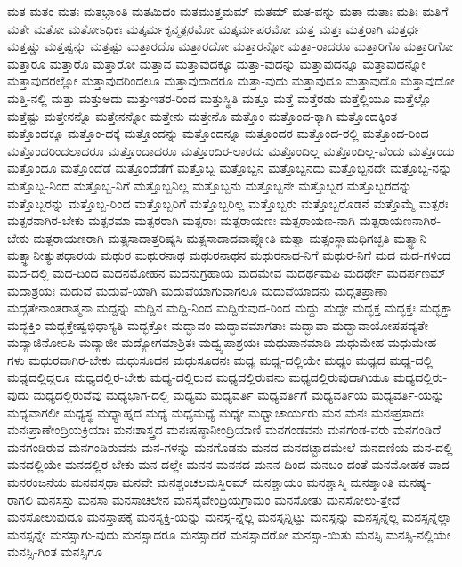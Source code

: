 {ಮತ
ಮತಂ
ಮತಃ
ಮತಭ್ರಾಂತಿ
ಮತಮಿದಂ
ಮತಮುತ್ತಮಮ್
ಮತಮ್
ಮತ-ವನ್ನು
ಮತಾ
ಮತಾಃ
ಮತಿಃ
ಮತಿಗೆ
ಮತೇ
ಮತೋ
ಮತೋಽಧಿಕಃ
ಮತ್ಕರ್ಮಕೃನ್ಮತ್ಪರಮೋ
ಮತ್ಕರ್ಮಪರಮೋ
ಮತ್ತ
ಮತ್ತಃ
ಮತ್ತರಾಗಿ
ಮತ್ತರ್ಧ
ಮತ್ತಷ್ಚು
ಮತ್ತಷ್ಟನ್ನು
ಮತ್ತಷ್ಟು
ಮತ್ತಾರದೊ
ಮತ್ತಾರದೋ
ಮತ್ತಾರನ್ನೋ
ಮತ್ತಾ-ರಾದರೂ
ಮತ್ತಾರಿಗೊ
ಮತ್ತಾರಿಗೋ
ಮತ್ತಾರೂ
ಮತ್ತಾರೊ
ಮತ್ತಾರೋ
ಮತ್ತಾವ
ಮತ್ತಾವುದಕ್ಕೂ
ಮತ್ತಾ-ವುದನ್ನು
ಮತ್ತಾವುದನ್ನೂ
ಮತ್ತಾವುದನ್ನೋ
ಮತ್ತಾವುದರಲ್ಲೋ
ಮತ್ತಾವುದರಿಂದಲೂ
ಮತ್ತಾವುದಾದರೂ
ಮತ್ತಾ-ವುದು
ಮತ್ತಾವುದೂ
ಮತ್ತಾವುದೊ
ಮತ್ತಾವುದೋ
ಮತ್ತಿ-ನಲ್ಲಿ
ಮತ್ತು
ಮತ್ತುಅದು
ಮತ್ತುಇತರ-ರಿಂದ
ಮತ್ತುಸ್ಥಿತಿ
ಮತ್ತೂ
ಮತ್ತೆ
ಮತ್ತೆರಡು
ಮತ್ತೆಲ್ಲಿಯೂ
ಮತ್ತೆಲ್ಲೊ
ಮತ್ತೆಷ್ಟು
ಮತ್ತೇನನ್ನೊ
ಮತ್ತೇನನ್ನೋ
ಮತ್ತೇನು
ಮತ್ತೇನೊ
ಮತ್ತೊಂ
ಮತ್ತೊಂದ-ಕ್ಕಾಗಿ
ಮತ್ತೊಂದಕ್ಕಿಂತ
ಮತ್ತೊಂದಕ್ಕೂ
ಮತ್ತೊಂ-ದಕ್ಕೆ
ಮತ್ತೊಂದನ್ನು
ಮತ್ತೊಂದನ್ನೂ
ಮತ್ತೊಂದರ
ಮತ್ತೊಂದ-ರಲ್ಲಿ
ಮತ್ತೊಂದ-ರಿಂದ
ಮತ್ತೊಂದರಿಂದಲಾದರೂ
ಮತ್ತೊಂದಾದರೂ
ಮತ್ತೊಂದಿರ-ಲಾರದು
ಮತ್ತೊಂದಿಲ್ಲ
ಮತ್ತೊಂದಿಲ್ಲ-ವೆಂದು
ಮತ್ತೊಂದು
ಮತ್ತೊಂದೂ
ಮತ್ತೊಂದೆಡೆ
ಮತ್ತೊಂದೆಡೆಗೆ
ಮತ್ತೊಬ್ಬ
ಮತ್ತೊಬ್ಬನ
ಮತ್ತೊಬ್ಬನದು
ಮತ್ತೊಬ್ಬನದೇ
ಮತ್ತೊಬ್ಬ-ನನ್ನು
ಮತ್ತೊಬ್ಬ-ನಿಂದ
ಮತ್ತೊಬ್ಬ-ನಿಗೆ
ಮತ್ತೊಬ್ಬನಿಲ್ಲ
ಮತ್ತೊಬ್ಬನು
ಮತ್ತೊಬ್ಬನೇ
ಮತ್ತೊಬ್ಬರ
ಮತ್ತೊಬ್ಬರದನ್ನು
ಮತ್ತೊಬ್ಬರನ್ನು
ಮತ್ತೊಬ್ಬ-ರಿಂದ
ಮತ್ತೊಬ್ಬರಿಗೆ
ಮತ್ತೊಬ್ಬರಿಲ್ಲ
ಮತ್ತೊಬ್ಬರು
ಮತ್ತೊಬ್ಬರೊಡನೆ
ಮತ್ತೊಮ್ಮೆ
ಮತ್ಪರಃ
ಮತ್ಪರನಾಗಿರ-ಬೇಕು
ಮತ್ಪರಮಾ
ಮತ್ಪರರಾಗಿ
ಮತ್ಪರಾಃ
ಮತ್ಪರಾಯಣಃ
ಮತ್ಪರಾಯಣ-ನಾಗಿ
ಮತ್ಪರಾಯಣನಾಗಿರ-ಬೇಕು
ಮತ್ಪರಾಯಣರಾಗಿ
ಮತ್ಪ್ರಸಾದಾತ್ತರಿಷ್ಯಸಿ
ಮತ್ಪ್ರಸಾದಾದವಾಪ್ನೋತಿ
ಮತ್ವಾ
ಮತ್ಸಂಸ್ಥಾಮಧಿಗಚ್ಛತಿ
ಮತ್ಸ್ಥಾನಿ
ಮತ್ಸ್ಥಾನೀತ್ಯುಪಧಾರಯ
ಮಥುರ
ಮಥುರನಾಥ
ಮಥುರನಾಥನ
ಮಥುರನಾಥ-ನಿಗೆ
ಮಥುರ-ನಿಗೆ
ಮದ
ಮದ-ಗಳಿಂದ
ಮದ-ದಲ್ಲಿ
ಮದ-ದಿಂದ
ಮದನಮೋಹನ
ಮದನುಗ್ರಹಾಯ
ಮದಮೇವ
ಮದರ್ಥಮಪಿ
ಮದರ್ಥೇ
ಮದರ್ಪಣಮ್
ಮದಾಶ್ರಯಃ
ಮದುವೆ
ಮದುವೆ-ಯಾಗಿ
ಮದುವೆಯಾಗುವಾಗಲೂ
ಮದುವೆಯಾದನು
ಮದ್ಗತಪ್ರಾಣಾ
ಮದ್ಗತೇನಾಂತರಾತ್ಮನಾ
ಮದ್ದನ್ನು
ಮದ್ದಿನ
ಮದ್ದಿ-ನಿಂದ
ಮದ್ದಿರುವುದ-ರಿಂದ
ಮದ್ದು
ಮದ್ದೇ
ಮದ್ಭಕ್ತ
ಮದ್ಭಕ್ತಃ
ಮದ್ಭಕ್ತಾ
ಮದ್ಭಕ್ತಿಂ
ಮದ್ಭಕ್ತೇಷ್ವಭಿಧಾಸ್ಯತಿ
ಮದ್ಭಕ್ತೋ
ಮದ್ಭಾವಂ
ಮದ್ಭಾವಮಾಗತಾಃ
ಮದ್ಭಾವಾ
ಮದ್ಭಾವಾಯೋಪಪದ್ಯತೇ
ಮದ್ಯಾಜಿನೋಽಪಿ
ಮದ್ಯಾಜೀ
ಮದ್ಯೋಗಮಾಶ್ರಿತಃ
ಮದ್ವ್ಯಪಾಶ್ರಯಃ
ಮಧುಪಾನಮಾಡಿ
ಮಧುಮೇಹ
ಮಧುಮೇಹ-ಗಳು
ಮಧುರವಾಗಿರ-ಬೇಕು
ಮಧುಸೂದನ
ಮಧುಸೂದನಃ
ಮಧ್ಯ
ಮಧ್ಯ-ದಲ್ಲಿಯೇ
ಮಧ್ಯಂ
ಮಧ್ಯದ
ಮಧ್ಯ-ದಲ್ಲಿ
ಮಧ್ಯದಲ್ಲಿದ್ದರೂ
ಮಧ್ಯದಲ್ಲಿರ-ಬೇಕು
ಮಧ್ಯ-ದಲ್ಲಿರುವ
ಮಧ್ಯದಲ್ಲಿರುವನು
ಮಧ್ಯದಲ್ಲಿರುವುದಾಗಿಯೂ
ಮಧ್ಯದಲ್ಲಿರು-ವುದು
ಮಧ್ಯದಲ್ಲಿರುವೆವು
ಮಧ್ಯಭಾಗ-ದಲ್ಲಿ
ಮಧ್ಯಮ
ಮಧ್ಯವರ್ತಿ
ಮಧ್ಯವರ್ತಿಗೆ
ಮಧ್ಯವರ್ತಿಯ
ಮಧ್ಯವರ್ತಿ-ಯನ್ನು
ಮಧ್ಯವಾಗಲೀ
ಮಧ್ಯಸ್ಥ
ಮಧ್ಯಾಹ್ನದ
ಮಧ್ಯೆ
ಮಧ್ಯೆಮಧ್ಯೆ
ಮಧ್ಯೇ
ಮಧ್ವಾಚಾರ್ಯರು
ಮನ
ಮನಃ
ಮನಃಪ್ರಸಾದಃ
ಮನಃಪ್ರಾಣೇಂದ್ರಿಯಕ್ರಿಯಾಃ
ಮನಃಶಾಸ್ತ್ರದ
ಮನಃಷಷ್ಠಾನೀಂದ್ರಿಯಾಣಿ
ಮನಗಂಡವನು
ಮನಗಂಡ-ವರು
ಮನಗಂಡಿದೆ
ಮನಗಂಡಿರುವ
ಮನಗಂಡಿರುವನು
ಮನ-ಗಳನ್ನು
ಮನಗೊಡನು
ಮನದ
ಮನದಟ್ಟಾದಮೇಲೆ
ಮನದಣಿಯ
ಮನ-ದಲ್ಲಿ
ಮನದಲ್ಲಿಯೇ
ಮನದಲ್ಲಿರ-ಬೇಕು
ಮನ-ದಲ್ಲೇ
ಮನನ
ಮನನದ
ಮನನ-ದಿಂದ
ಮನಬಂ-ದಂತೆ
ಮನಮೋಹಕ-ವಾದ
ಮನರಂಜನೆಯ
ಮನವಸ್ತಥಾ
ಮನವೇ
ಮನಶ್ಚಂಚಲಮಸ್ಥಿರಮ್
ಮನಶ್ಚಾಯಂ
ಮನಶ್ಚಾಸ್ಮಿ
ಮನಶ್ಶಾಂತಿ
ಮನಷ್ಯ-ರಾಗಲಿ
ಮನಸಸ್ತು
ಮನಸಾ
ಮನಸಾಚಲೇನ
ಮನಸೈವೇಂದ್ರಿಯಗ್ರಾಮಂ
ಮನಸೋತು
ಮನಸೋಲು-ತ್ತೇವೆ
ಮನಸೋಲುವುದೂ
ಮನಸ್ತಾಪಕ್ಕೆ
ಮನಸ್ಶಕ್ತಿ-ಯನ್ನು
ಮನಸ್ಸ-ನ್ನೆಲ್ಲ
ಮನಸ್ಸನ್ನಿಟ್ಟು
ಮನಸ್ಸನ್ನು
ಮನಸ್ಸನ್ನೆಲ್ಲ
ಮನಸ್ಸನ್ನೆಲ್ಲಾ
ಮನಸ್ಸನ್ನೇ
ಮನಸ್ಸಾಗು-ವುದು
ಮನಸ್ಸಾದರೂ
ಮನಸ್ಸಾದರೆ
ಮನಸ್ಸಾದರೋ
ಮನಸ್ಸಾ-ಯಿತು
ಮನಸ್ಸಿ
ಮನಸ್ಸಿ-ನಲ್ಲಿಯೇ
ಮನಸ್ಸಿ-ಗಿಂತ
ಮನಸ್ಸಿಗೂ
}
